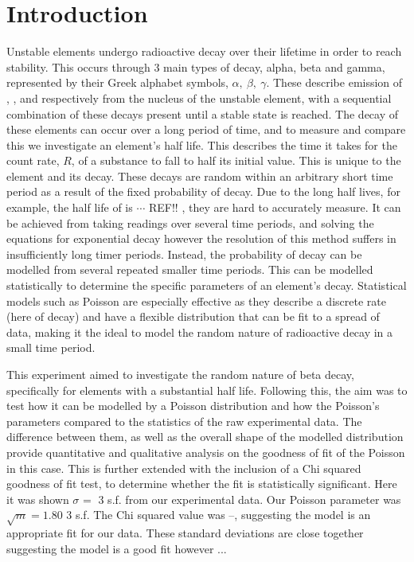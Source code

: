 \documentclass[11pt]{article}
\begin{document}
    \section{Introduction}
    Unstable elements undergo radioactive decay over their lifetime in order to reach stability. This occurs through 3 main types of decay, alpha, beta and gamma, represented by their Greek alphabet symbols, $\alpha,\  \beta,\ \gamma$.  These describe emission of , , and  respectively from the nucleus of the unstable element, with a sequential combination of these decays present until a stable state is reached. The decay of these elements can occur over a long period of time, and to measure and compare this we investigate an element's half life. This describes the time it takes for the count rate, $R$, of a substance to fall to half its initial value. This is unique to the element and its decay.
    These decays are random within an arbitrary short time period as a result of the fixed probability of decay. Due to the long half lives, for example, the half life of  is $\cdots$ REF!! , they are hard to accurately measure.  It can be achieved from taking readings over several time periods, and solving the equations for exponential decay however the resolution of this method suffers in insufficiently long timer periods. Instead, the probability of decay can be modelled from several repeated smaller time periods. This can be modelled statistically to determine the  specific parameters of an element's decay. Statistical models such as Poisson are especially effective as they describe a discrete rate (here of decay) and have a flexible distribution that can be fit to a spread of data, making it the ideal to model the random nature of radioactive decay in a small time period. 
    
    This experiment aimed to investigate the random nature of beta decay, specifically for elements with a substantial half life. Following this, the aim was to test how it can be modelled by a Poisson distribution and how the Poisson's parameters compared to the statistics of the raw experimental data. The difference between them, as well as the overall shape of the modelled distribution provide quantitative and qualitative analysis on the goodness of fit of the Poisson in this case. This is further extended with the inclusion of a Chi squared goodness of fit test, to determine whether the fit is statistically significant.  
    Here it was shown $\sigma_{} = $ 3 s.f. from our experimental data. Our Poisson parameter was $\sqrt{m} = 1.80$ 3 s.f. The Chi squared value was --, suggesting the model is an appropriate fit for our data. These standard deviations are close together suggesting the model is a good fit however ...
\end{document}
